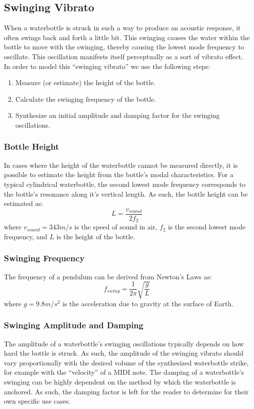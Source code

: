 \documentclass[twoside,a4paper]{article}
\begin{document}
\subsection{Swinging Vibrato} \label{sec:swing}
%
When a waterbottle is struck in such a way to produce an acoustic
response, it often swings back and forth a little bit. This swinging
causes the water within the bottle to move with the swinging, thereby
causing the lowest mode frequency to oscillate. This oscillation
manifests itself perceptually as a sort of vibrato effect. In
order to model this ``swinging vibrato'' we use the following
steps:
\begin{enumerate}
    \item Measure (or estimate) the height of the bottle.
    \item Calculate the swinging frequency of the bottle.
    \item Synthesize an initial amplitude and damping factor
        for the swinging oscillations.
\end{enumerate}
%
\subsubsection{Bottle Height}
%
In cases where the height of the waterbottle cannot be measured directly,
it is possible to estimate the height from the bottle's modal characteristics.
For a typical cylindrical waterbottle, the second lowest mode frequency
corresponds to the bottle's resonance along it's vertical length. As such,
the bottle height can be estimated as:
\begin{equation}
    L = \frac{v_{sound}}{2 f_2}
    \label{eq:bottle-height}
\end{equation}
where $v_{sound} = 343 m/s$ is the speed of sound in air, $f_2$ is the second
lowest mode frequency, and $L$ is the height of the bottle.
%
\subsubsection{Swinging Frequency}
%
The frequency of a pendulum can be derived from Newton's Laws as:
\begin{equation}
    f_{swing} = \frac{1}{2\pi} \sqrt{\frac{g}{L}}
    \label{eq:swing-freq}
\end{equation}
where $g = 9.8 m/s^2$ is the acceleration due to gravity at the surface
of Earth.
%
\subsubsection{Swinging Amplitude and Damping}
%
The amplitude of a waterbottle's swinging oscillations typically depends
on how hard the bottle is struck. As such, the amplitude of the swinging
vibrato should vary proportionally with the desired volume of the synthesized
waterbottle strike, for example with the ``velocity'' of a MIDI note.
The damping of a waterbottle's swinging can be highly dependent on the method
by which the waterbottle is anchored. As such, the damping factor is left
for the reader to determine for their own specific use cases.
\end{document}
